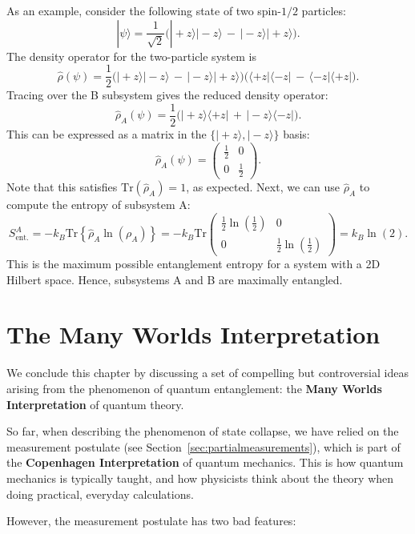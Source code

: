 \documentclass[pra,12pt]{revtex4}
\begin{document}
As an example, consider the following state of two spin-$1/2$ particles:
$$|\psi\rangle = \frac{1}{\sqrt{2}} \Big(|\!+\!z\rangle|\!-\!z\rangle \,-\, |\!-\!z\rangle|\!+\!z\rangle\Big).$$
The density operator for the two-particle system is
$$\hat{\rho}(\psi) = \frac{1}{2} \Big(|\!+\!z\rangle|\!-\!z\rangle \,-\, |\!-\!z\rangle|\!+\!z\rangle\Big) \Big(\langle+z|\langle-z| \,-\, \langle-z|\langle+z|\Big).$$
Tracing over the B subsystem gives the reduced density operator:
$$\hat{\rho}_A(\psi) = \frac{1}{2} \Big(|\!+\!z\rangle \langle+z| \,+\, |\!-\!z\rangle \langle-z|\Big).$$
This can be expressed as a matrix in the
$\{|\!+z\rangle,|\!-z\rangle\}$ basis:
$$\hat{\rho}_A(\psi) = \begin{pmatrix}\frac{1}{2} & 0 \\ 0 & \frac{1}{2}\end{pmatrix}.$$
Note that this satisfies $\mathrm{Tr}(\hat\rho_A) = 1$, as expected.
Next, we can use $\hat{\rho}_A$ to compute the entropy of subsystem A:
$$S_{\mathrm{ent.}}^A = -k_B\mathrm{Tr}\left\{\hat{\rho}_A\ln(\rho_A)\right\} = -k_B\mathrm{Tr}\begin{pmatrix}\frac{1}{2}\ln\left(\frac{1}{2}\right) & 0 \\ 0 & \frac{1}{2}\ln\left(\frac{1}{2}\right)\end{pmatrix} = k_B\ln(2).$$
This is the maximum possible entanglement entropy for a system with a
2D Hilbert space.  Hence, subsystems A and B are maximally entangled.

\section{The Many Worlds Interpretation}

We conclude this chapter by discussing a set of compelling but
controversial ideas arising from the phenomenon of quantum
entanglement: the \textbf{Many Worlds Interpretation} of quantum
theory.

So far, when describing the phenomenon of state collapse, we have
relied on the measurement postulate (see
Section~\ref{sec:partialmeasurements}), which is part of the
\textbf{Copenhagen Interpretation} of quantum mechanics.  This is how
quantum mechanics is typically taught, and how physicists think about
the theory when doing practical, everyday calculations.

However, the measurement postulate has two bad features:
\end{document}
